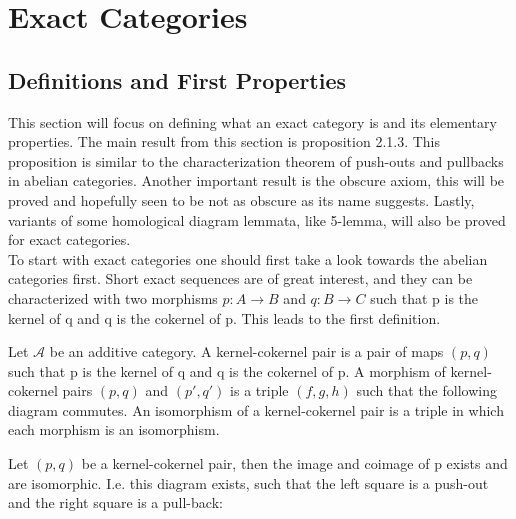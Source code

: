 \chapter{Exact Categories}

\section{Definitions and First Properties}

    This section will focus on defining what an exact category is and its elementary properties. The main result from this section is proposition 2.1.3. This proposition is similar to the characterization theorem of push-outs and pullbacks in abelian categories. Another important result is the obscure axiom, this will be proved and hopefully seen to be not as obscure as its name suggests. Lastly, variants of some homological diagram lemmata, like 5-lemma, will also be proved for exact categories. \\

    To start with exact categories one should first take a look towards the abelian categories first. Short exact sequences are of great interest, and they can be characterized with two morphisms $p:A\rightarrow B$ and $q:B\rightarrow C$ such that p is the kernel of q and q is the cokernel of p. This leads to the first definition.

    \begin{definition}
        Let $\mathcal{A}$ be an additive category. A kernel-cokernel pair is a pair of maps $(p,q)$ such that p is the kernel of q and q is the cokernel of p. A morphism of kernel-cokernel pairs $(p,q)$ and $(p',q')$ is a triple $(f,g,h)$ such that the following diagram commutes. An isomorphism of a kernel-cokernel pair is a triple in which each morphism is an isomorphism.
        \begin{center}
        \end{center}
    \end{definition}

    \begin{lemma}
        Let $(p,q)$ be a kernel-cokernel pair, then the image and coimage of p exists and are isomorphic. I.e. this diagram exists, such that the left square is a push-out and the right square is a pull-back:
        \begin{center}
        \end{center}
    \end{lemma}
    
